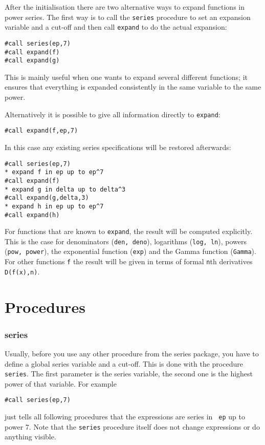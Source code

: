 \documentclass{article}
\begin{document}
After the initialisation there are two alternative ways to expand
functions in power series. The first way is to call the {\tt series}
procedure to set an expansion variable and a cut-off and then call
{\tt expand} to do the actual expansion:
\begin{verbatim}
#call series(ep,7)
#call expand(f)
#call expand(g)
\end{verbatim}
This is mainly useful when one wants to expand several different functions; it
ensures that everything is expanded consistently in the same variable to
the same power. 

Alternatively it is possible to give all information
directly to {\tt expand}:
\begin{verbatim}
#call expand(f,ep,7)
\end{verbatim}
In this case any existing series specifications will be restored
afterwards:
\begin{verbatim}
#call series(ep,7)
* expand f in ep up to ep^7
#call expand(f)
* expand g in delta up to delta^3
#call expand(g,delta,3)
* expand h in ep up to ep^7
#call expand(h)
\end{verbatim}


For functions that are known to {\tt expand}, the result will be
computed explicitly. This is the case for denominators ({\tt den,
deno}), logarithms ({\tt log, ln}), powers ({\tt pow, power}), the
exponential function ({\tt exp}) and the Gamma function ({\tt Gamma}).
For other functions {\tt f} the result will be given in terms of formal
{\tt n}th derivatives {\tt D(f(x),n)}.

\section{Procedures}
\label{sec:proc}


\subsubsection{series}
\label{sec:series}

Usually, before you use any other procedure from the series package, you have to
define a global series variable and a cut-off. This is done with the
procedure {\tt series}. The first parameter is the series variable, the
second one is the highest power of that variable. For example
\begin{verbatim}
#call series(ep,7)
\end{verbatim}
just tells all following procedures that the expressions are series in {\tt
  ep} up to power 7. Note that the {\tt series} procedure itself does
not change expressions or do anything visible.
\end{document}
